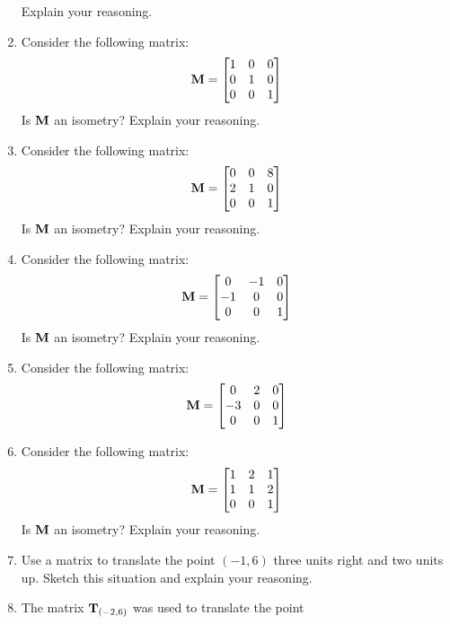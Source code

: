 \begin{problems}
\begin{enumerate}
  Explain your reasoning.
\item Consider the following matrix:
\[
\mathbf{M} = 
\begin{bmatrix}
1 & 0 & 0\\
0 & 1 & 0\\
0 & 0 & 1
\end{bmatrix}
\]
Is $\mathbf{M}$ an isometry? Explain your reasoning.
\item Consider the following matrix:
\[
\mathbf{M} = 
\begin{bmatrix}
0 & 0 & 8\\
2 & 1 & 0\\
0 & 0 & 1
\end{bmatrix}
\]
Is $\mathbf{M}$ an isometry? Explain your reasoning.
\item Consider the following matrix:
\[
\mathbf{M} = 
\begin{bmatrix}
0  & -1  & 0\\
-1 & 0  & 0\\
0  & 0  & 1
\end{bmatrix}
\]
Is $\mathbf{M}$ an isometry? Explain your reasoning.
\item Consider the following matrix:
\[
\mathbf{M} = 
\begin{bmatrix}
0  & 2  & 0\\
-3 & 0  & 0\\
0  & 0  & 1
\end{bmatrix}
\]
\item Consider the following matrix:
\[
\mathbf{M} = 
\begin{bmatrix}
1  & 2  & 1\\
1 & 1  & 2\\
0  & 0  & 1
\end{bmatrix}
\]
Is $\mathbf{M}$ an isometry? Explain your reasoning.
\item Use a matrix to translate the point $(-1,6)$ three units right
  and two units up. Sketch this situation and explain your reasoning.
\item The matrix $\mathbf{T}_{(-2,6)}$ was used to translate the point

\end{enumerate}
\end{problems}
